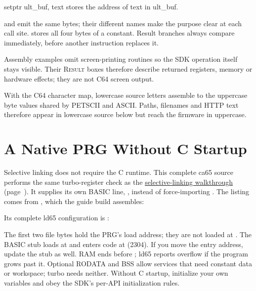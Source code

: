 \begin{resultbox}
setptr ult_buf, text stores the address of text in ult_buf.
\end{resultbox}

 and  emit the same bytes; their different names make
the purpose clear at each call site.  stores all four bytes of a
constant. Result branches always compare 
immediately, before another instruction replaces it.

Assembly examples omit screen-printing routines so the SDK operation itself
stays visible. Their \textsc{Result} boxes therefore describe returned
registers, memory or hardware effects; they are not C64 screen output.

With the C64 character map, lowercase source letters assemble to the uppercase
byte values shared by PETSCII and ASCII. Paths, filenames and HTTP text
therefore appear in lowercase source below but reach the firmware in uppercase.


\section{A Native PRG Without C Startup}
\label{sec:native-selective}

Selective linking does not require the C runtime. This complete ca65 source
performs the same turbo-register check as the
\hyperref[sec:selective-linking]{selective-linking walkthrough}
(page~\pageref{sec:selective-linking}).
It supplies its own BASIC line, , instead of force-importing
. The listing comes from
, which the guide build assembles:

\begin{listingbox}[before upper={}]

\end{listingbox}

Its complete ld65 configuration is :
\begin{listingbox}[before upper={}]

\end{listingbox}

The first two file bytes hold the PRG's load address; they are not loaded at
. The BASIC stub loads at  and enters code at
 (2304). If you move the entry address, update the stub as well.
RAM ends before ; ld65 reports overflow if the program grows past
it. Optional RODATA and BSS allow services that need constant data or workspace;
turbo needs neither. Without C startup, initialize your own variables and obey
the SDK's per-API initialization rules.

